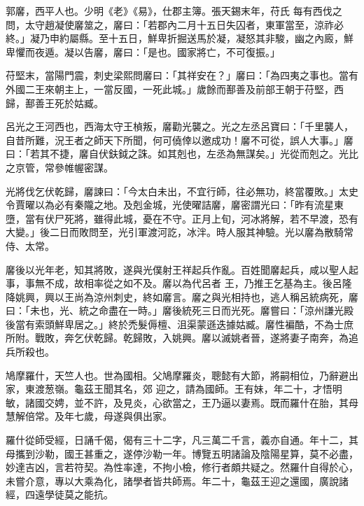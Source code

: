 \begin{pinyinscope}
 郭黁，西平人也。少明《老》《易》，仕郡主簿。張天錫末年，苻氏
 每有西伐之問，太守趙凝使黁筮之，黁曰：「若郡內二月十五日失囚者，東軍當至，涼祚必終。」凝乃申約屬縣。至十五日，鮮卑折掘送馬於凝，凝怒其非駿，幽之內廄，鮮卑懼而夜遁。凝以告黁，黁曰：「是也。國家將亡，不可復振。」



 苻堅末，當陽門震，刺史梁熙問黁曰：「其祥安在？」黁曰：「為四夷之事也。當有外國二王來朝主上，一當反國，一死此城。」歲餘而鄯善及前部王朝于苻堅，西歸，鄯善王死於姑臧。



 呂光之王河西也，西海太守王楨叛，黁勸光襲之。光之左丞呂寶曰：「千里襲人，自昔所難，況王者之師天下所聞，何可僥倖以邀成功！黁不可從，誤人大事。」黁
 曰：「若其不捷，黁自伏鈇鉞之誅。如其剋也，左丞為無謀矣。」光從而剋之。光比之京管，常參帷幄密謀。



 光將伐乞伏乾歸，黁諫曰：「今太白未出，不宜行師，往必無功，終當覆敗。」太史令賈曜以為必有秦隴之地。及剋金城，光使曜詰黁，黁密謂光曰：「昨有流星東墮，當有伏尸死將，雖得此城，憂在不守。正月上旬，河冰將解，若不早渡，恐有大變。」後二日而敗問至，光引軍渡河訖，冰泮。時人服其神驗。光以黁為散騎常侍、太常。



 黁後以光年老，知其將敗，遂與光僕射王祥起兵作亂。百姓聞黁起兵，咸以聖人起事，事無不成，故相率從之如不及。黁以為代呂者
 王，乃推王乞基為主。後呂隆降姚興，興以王尚為涼州刺史，終如黁言。黁之與光相持也，逃人稱呂統病死，黁曰：「未也，光、統之命盡在一時。」黁後統死三日而光死。黁嘗曰：「涼州謙光殿後當有索頭鮮卑居之。」終於禿髮傉檀、沮渠蒙遜迭據姑臧。黁性褊酷，不為士庶所附。戰敗，奔乞伏乾歸。乾歸敗，入姚興。黁以滅姚者晉，遂將妻子南奔，為追兵所殺也。



 鳩摩羅什，天竺人也。世為國相。父鳩摩羅炎，聰懿有大節，將嗣相位，乃辭避出家，東渡葱嶺。龜茲王聞其名，郊
 迎之，請為國師。王有妹，年二十，才悟明敏，諸國交娉，並不許，及見炎，心欲當之，王乃逼以妻焉。既而羅什在胎，其母慧解倍常。及年七歲，母遂與俱出家。



 羅什從師受經，日誦千偈，偈有三十二字，凡三萬二千言，義亦自通。年十二，其母攜到沙勒，國王甚重之，遂停沙勒一年。博覽五明諸論及陰陽星算，莫不必盡，妙達吉凶，言若符契。為性率達，不拘小檢，修行者頗共疑之。然羅什自得於心，未嘗介意，專以大乘為化，諸學者皆共師焉。年二十，龜茲王迎之還國，廣說諸經，四遠學徒莫之能抗。




\end{pinyinscope}
